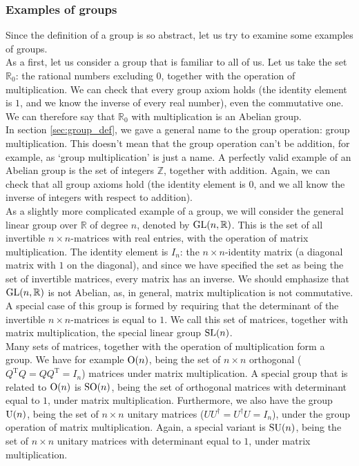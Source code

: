     \subsubsection{Examples of groups}
        Since the definition of a group is so abstract, let us try to examine some examples of groups. \\

        As a first, let us consider a group that is familiar to all of us. Let us take the set $\mathbb{R}_0$: the rational numbers excluding $0$, together with the operation of multiplication. We can check that every group axiom holds (the identity element is $1$, and we know the inverse of every real number), even the commutative one. We can therefore say that $\mathbb{R}_0$ with multiplication is an Abelian group. \\

        In section \ref{sec:group_def}, we gave a general name to the group operation: group multiplication. This doesn't mean that the group operation can't be addition, for example, as `group multiplication' is just a name. A perfectly valid example of an Abelian group is the set of integers $\mathbb{Z}$, together with addition. Again, we can check that all group axioms hold (the identity element is $0$, and we all know the inverse of integers with respect to addition). \\

        As a slightly more complicated example of a group, we will consider the general linear group over $\mathbb{R}$ of degree $n$, denoted by $\operatorname{GL}(n, \mathbb{R})$. This is the set of all invertible $n \times n$-matrices with real entries, with the operation of matrix multiplication. The identity element is $I_n$: the $n \times n$-identity matrix (a diagonal matrix with $1$ on the diagonal), and since we have specified the set as being the set of invertible matrices, every matrix has an inverse. We should emphasize that $\operatorname{GL}(n, \mathbb{R})$ is not Abelian, as, in general, matrix multiplication is not commutative. A special case of this group is formed by requiring that the determinant of the invertible $n \times n$-matrices is equal to $1$. We call this set of matrices, together with matrix multiplication, the special linear group $\operatorname{SL}(n)$. \\

        Many sets of matrices, together with the operation of multiplication form a group. We have for example $\operatorname{O}(n)$, being the set of $n \times n$ orthogonal ($Q^\text{T} Q = Q Q^\text{T} = I_n$) matrices under matrix multiplication. A special group that is related to $\operatorname{O}(n)$ is $\operatorname{SO}(n)$, being the set of orthogonal matrices with determinant equal to $1$, under matrix multiplication. Furthermore, we also have the group $\operatorname{U}(n)$, being the set of $n \times n$ unitary matrices ($U U^\dagger = U^\dagger U = I_n$), under the group operation of matrix multiplication. Again, a special variant is $\operatorname{SU}(n)$, being the set of $n \times n$ unitary matrices with determinant equal to $1$, under matrix multiplication. \\

